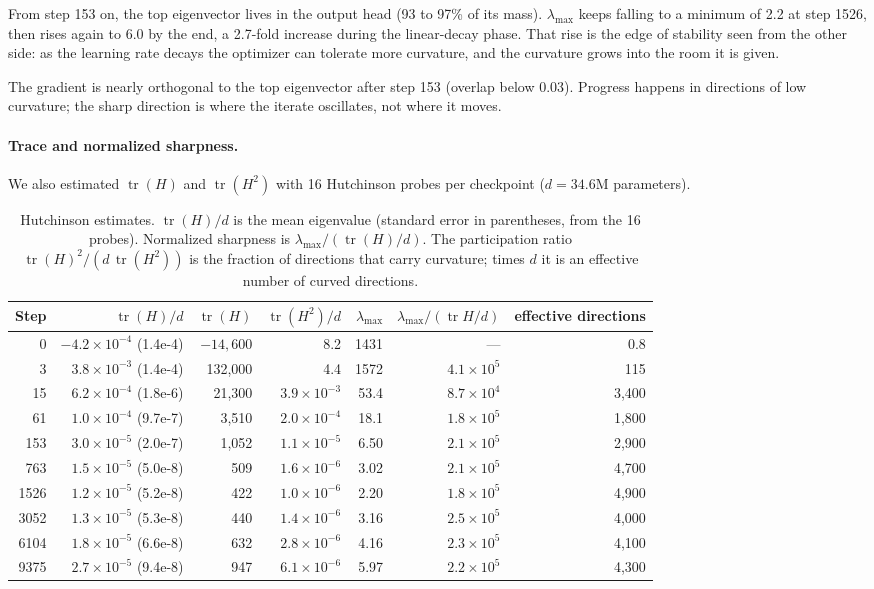 \documentclass[10pt,letterpaper]{article}
\newcommand{\lmax}{\lambda_{\max}}
\begin{document}
From step 153 on, the top eigenvector lives in the output head (93 to 97\% of its mass). $\lmax$ keeps falling to a minimum of 2.2 at step 1526, then rises again to 6.0 by the end, a 2.7-fold increase during the linear-decay phase. That rise is the edge of stability seen from the other side: as the learning rate decays the optimizer can tolerate more curvature, and the curvature grows into the room it is given.

The gradient is nearly orthogonal to the top eigenvector after step 153 (overlap below 0.03). Progress happens in directions of low curvature; the sharp direction is where the iterate oscillates, not where it moves.


\paragraph{Trace and normalized sharpness.} We also estimated $\operatorname{tr}(H)$ and $\operatorname{tr}(H^2)$ with 16 Hutchinson probes per checkpoint ($d=34.6$M parameters).

\begin{table}[H]\centering\small
\caption{Hutchinson estimates. $\operatorname{tr}(H)/d$ is the mean eigenvalue (standard error in parentheses, from the 16 probes). Normalized sharpness is $\lmax/(\operatorname{tr}(H)/d)$. The participation ratio $\operatorname{tr}(H)^2/(d\,\operatorname{tr}(H^2))$ is the fraction of directions that carry curvature; times $d$ it is an effective number of curved directions.}
\begin{tabular}{rrrrrrr}\toprule
Step & $\operatorname{tr}(H)/d$ & $\operatorname{tr}(H)$ & $\operatorname{tr}(H^2)/d$ & $\lmax$ & $\lmax/(\operatorname{tr}H/d)$ & effective directions\\\midrule
0 & $-4.2\times10^{-4}$ (1.4e-4) & $-14{,}600$ & 8.2 & 1431 & --- & 0.8\\
3 & $3.8\times10^{-3}$ (1.4e-4) & 132,000 & 4.4 & 1572 & $4.1\times10^{5}$ & 115\\
15 & $6.2\times10^{-4}$ (1.8e-6) & 21,300 & $3.9\times10^{-3}$ & 53.4 & $8.7\times10^{4}$ & 3,400\\
61 & $1.0\times10^{-4}$ (9.7e-7) & 3,510 & $2.0\times10^{-4}$ & 18.1 & $1.8\times10^{5}$ & 1,800\\
153 & $3.0\times10^{-5}$ (2.0e-7) & 1,052 & $1.1\times10^{-5}$ & 6.50 & $2.1\times10^{5}$ & 2,900\\
763 & $1.5\times10^{-5}$ (5.0e-8) & 509 & $1.6\times10^{-6}$ & 3.02 & $2.1\times10^{5}$ & 4,700\\
1526 & $1.2\times10^{-5}$ (5.2e-8) & 422 & $1.0\times10^{-6}$ & 2.20 & $1.8\times10^{5}$ & 4,900\\
3052 & $1.3\times10^{-5}$ (5.3e-8) & 440 & $1.4\times10^{-6}$ & 3.16 & $2.5\times10^{5}$ & 4,000\\
6104 & $1.8\times10^{-5}$ (6.6e-8) & 632 & $2.8\times10^{-6}$ & 4.16 & $2.3\times10^{5}$ & 4,100\\
9375 & $2.7\times10^{-5}$ (9.4e-8) & 947 & $6.1\times10^{-6}$ & 5.97 & $2.2\times10^{5}$ & 4,300\\\bottomrule
\end{tabular}
\end{table}
\end{document}
